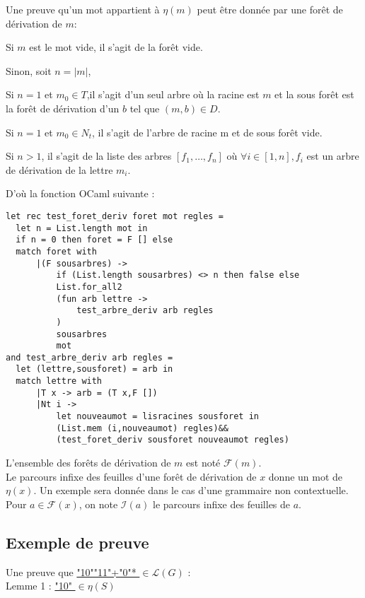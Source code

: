 \documentclass[a4paper,12pt]{article}
\newcommand{\norm}[1]{\lvert #1 \rvert}
\newlength{\mydepth}
\newlength{\myheight}
\newenvironment{answer}
{\par\begin{lrbox}{\mybox}\quad\begin{minipage}{\linewidth}\color{black}\setlength{\parskip}{10pt plus 1pt minus 1pt}\vspace*{-.7\baselineskip}}
{\end{minipage}\end{lrbox}
\settodepth{\mydepth}{\usebox{\mybox}}
\settoheight{\myheight}{\usebox{\mybox}}
\addtolength{\myheight}{\mydepth}
\noindent\makebox[0pt]{
  \color{gray}\hspace{-0pt}\rule[-\mydepth]{1pt}{\myheight}}
  \usebox{\mybox}
  }
\begin{document}
Une preuve qu'un mot appartient à $\eta(m)$ peut être donnée par une forêt de dérivation de $m$:

\begin{answer} 
Si $m$ est le mot vide, il s'agit de la forêt vide.

Sinon, soit $n = \norm{m}$,\\
\begin{answer} 
    Si $n=1$ et $m_0 \in T$,il s'agit d'un seul arbre où la racine est $m$ et la sous forêt est la forêt de dérivation d'un $b$ tel que $(m,b) \in D$.

    Si $n=1$ et $m_0 \in N_t$, il s'agit de l'arbre de racine m et de sous forêt vide.

    Si $n>1$, il s'agit de la liste des arbres $[f_1, \dots, f_n]$ où $\forall i \in [1,n], f_i$ est un arbre de dérivation de la lettre $m_i$.
\end{answer}
\end{answer}

D'où la fonction OCaml suivante :

{\color{DarkBlue}\begin{verbatim}
let rec test_foret_deriv foret mot regles =
  let n = List.length mot in
  if n = 0 then foret = F [] else
  match foret with
      |(F sousarbres) ->
          if (List.length sousarbres) <> n then false else
          List.for_all2
          (fun arb lettre ->
              test_arbre_deriv arb regles
          )
          sousarbres
          mot
and test_arbre_deriv arb regles =
  let (lettre,sousforet) = arb in
  match lettre with
      |T x -> arb = (T x,F [])
      |Nt i ->
          let nouveaumot = lisracines sousforet in
          (List.mem (i,nouveaumot) regles)&&
          (test_foret_deriv sousforet nouveaumot regles)
\end{verbatim}}

L'ensemble des forêts de dérivation de $m$ est noté $\mathcal{F}(m)$.\\
Le parcours infixe des feuilles d'une forêt de dérivation de $x$ donne un mot de $\eta(x)$.
Un exemple sera donnée dans le cas d'une grammaire non contextuelle.\\
Pour $a \in \mathcal{F}(x)$, on note $\mathcal{I}(a)$ le parcours infixe des feuilles de $a$. 

\subsection{Exemple de preuve}

Une preuve que \underline{ "10""11"+"0"* } $\in \mathcal{L}(G)$ :\\
Lemme 1 : \underline{ "10" } $\in \eta(S)$
\end{document}
